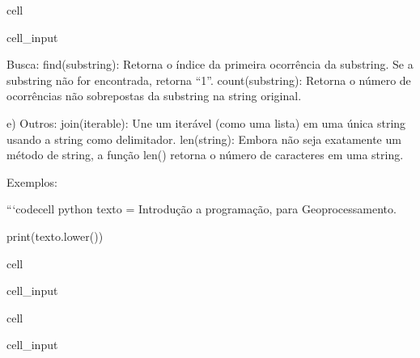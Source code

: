 \documentclass[letterpaper,10pt,english]{jupyterBook}
\begin{document}
\begin{sphinxuseclass}{cell}
\begin{sphinxVerbatimInput}
\begin{sphinxuseclass}{cell_input}
\begin{sphinxVerbatim}[commandchars=\\\{\}]
Busca:
find(substring): Retorna o índice da primeira ocorrência da substring. Se a substring não for encontrada, retorna “\PYGZhy{}1”.
count(substring): Retorna o número de ocorrências não sobrepostas da substring na string original.

e) Outros:
join(iterable): Une um iterável (como uma lista) em uma única string usando a string como delimitador.
len(string): Embora não seja exatamente um método de string, a função len() retorna o número de caracteres em uma string.

Exemplos:

```\PYGZob{}code\PYGZhy{}cell\PYGZcb{} python
texto = \PYGZsq{}Introdução a programação, para Geoprocessamento.\PYGZsq{}

print(texto.lower())  
\end{sphinxVerbatim}

\end{sphinxuseclass}\end{sphinxVerbatimInput}

\end{sphinxuseclass}
\begin{sphinxuseclass}{cell}\begin{sphinxVerbatimInput}

\begin{sphinxuseclass}{cell_input}
\begin{sphinxVerbatim}[commandchars=\\\{\}]
\end{sphinxVerbatim}

\end{sphinxuseclass}\end{sphinxVerbatimInput}

\end{sphinxuseclass}
\begin{sphinxuseclass}{cell}\begin{sphinxVerbatimInput}

\begin{sphinxuseclass}{cell_input}
\begin{sphinxVerbatim}[commandchars=\\\{\}]
  
\end{sphinxVerbatim}

\end{sphinxuseclass}\end{sphinxVerbatimInput}

\end{sphinxuseclass}
\end{document}
